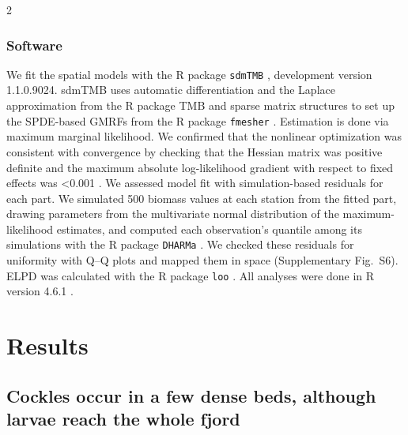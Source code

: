 \begin{spacing}{2}
\subsubsection{Software}
We fit the spatial models with the R package \texttt{sdmTMB} \citep{andersonSdmTMBPackageFast2025}, development version 1.1.0.9024. sdmTMB uses automatic differentiation and the Laplace approximation from the R package TMB \citep{kristensenTMBAutomaticDifferentiation2016} and sparse matrix structures to set up the SPDE-based GMRFs from the R package \texttt{fmesher} \citep{lindgrenFmesherTriangleMeshes2025}. Estimation is done via maximum marginal likelihood. We confirmed that the nonlinear optimization was consistent with convergence by checking that the Hessian matrix was positive definite and the maximum absolute log-likelihood gradient with respect to fixed effects was <0.001 \citep{andersonSdmTMBPackageFast2025}. We assessed model fit with simulation-based residuals for each part. We simulated 500 biomass values at each station from the fitted part, drawing parameters from the multivariate normal distribution of the maximum-likelihood estimates, and computed each observation's quantile among its simulations with the R package \texttt{DHARMa} \citep{hartigDHARMaResidualDiagnostics2022}. We checked these residuals for uniformity with Q–Q plots and mapped them in space (Supplementary Fig.~S6). ELPD was calculated with the R package \texttt{loo} \citep{vehtari2017practical}. All analyses were done in R version 4.6.1 \citep{rcore2024}.

\section{Results}

\subsection{Cockles occur in a few dense beds, although larvae reach the whole fjord}



\end{spacing}
